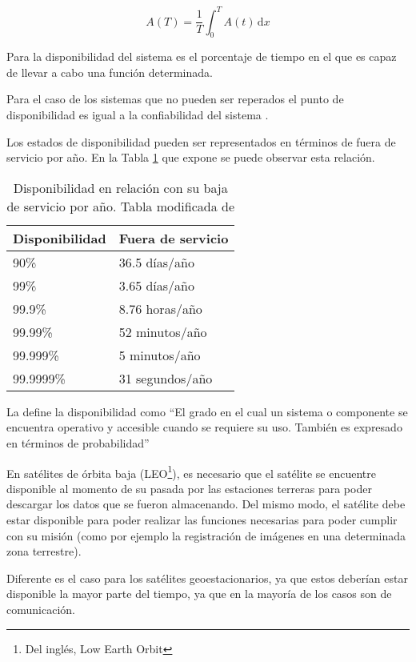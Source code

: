 $$A(T) = \frac{1}{T} \int_0^T \! A(t) \, \mathrm{d}x $$

Para \cite{Hanmer07} la disponibilidad del sistema es el porcentaje de tiempo en el que es capaz de 
llevar a cabo una función determinada. 

Para el caso de los sistemas que no pueden ser reperados el punto de disponibilidad es igual a la 
confiabilidad del sistema \citep{FTDesign}.

Los estados de disponibilidad pueden ser representados en términos de fuera de servicio por año. En 
la Tabla \ref{table:avalVSdowntime} que expone \cite{FTDesign} se puede observar esta relación.

\begin{table}[h]
  \centering
  \begin{tabular}{l|l}
    \hline
    Disponibilidad & Fuera de servicio \\ \hline
    90\%           & 36.5 días/año     \\
    99\%           & 3.65 días/año     \\
    99.9\%         & 8.76 horas/año    \\
    99.99\%        & 52 minutos/año    \\
    99.999\%       & 5 minutos/año     \\
    99.9999\%      & 31 segundos/año   \\ \hline
  \end{tabular}
  \caption{Disponibilidad en relación con su baja de servicio por año. Tabla 
modificada de \protect\cite{FTDesign}}
  \label{table:avalVSdowntime}
\end{table}

La \cite{IEEE610.12} define la disponibilidad como ``El grado en el cual un sistema o 
componente se encuentra operativo y accesible cuando se requiere su uso. También es expresado en 
términos de probabilidad''

En satélites de órbita baja (LEO\footnote{Del inglés, Low Earth Orbit}), es necesario que el 
satélite se encuentre disponible al momento de su pasada por las estaciones terreras para poder 
descargar los datos que se fueron almacenando. Del mismo modo, el satélite debe estar disponible 
para poder realizar las funciones necesarias para poder cumplir con su misión (como por ejemplo la 
registración de imágenes en una determinada zona terrestre). 

Diferente es el caso para los satélites geoestacionarios, ya que estos deberían estar disponible la 
mayor parte del tiempo, ya que en la mayoría de los casos son de comunicación. 

